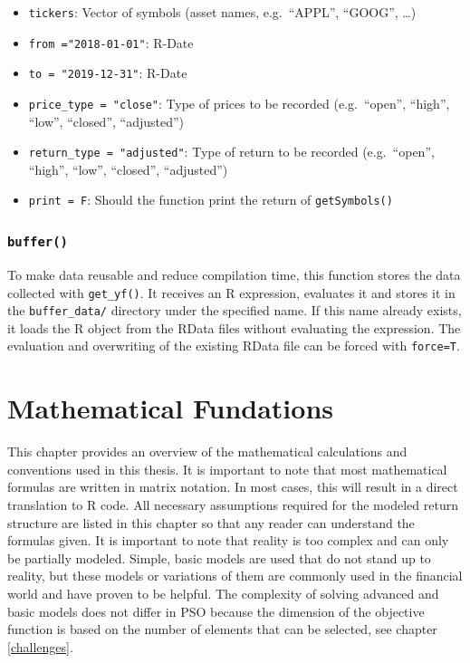 \documentclass[
  oneside]{book}
\providecommand{\tightlist}{%
  \setlength{\itemsep}{0pt}\setlength{\parskip}{0pt}}
\begin{document}
\begin{itemize}
\tightlist
\item
  \texttt{tickers}: Vector of symbols (asset names, e.g.~``APPL'', ``GOOG'', \ldots)
\item
  \texttt{from\ ="2018-01-01"}: R-Date
\item
  \texttt{to\ =\ "2019-12-31"}: R-Date
\item
  \texttt{price\_type\ =\ "close"}: Type of prices to be recorded (e.g.~``open'', ``high'', ``low'', ``closed'', ``adjusted'')
\item
  \texttt{return\_type\ =\ "adjusted"}: Type of return to be recorded (e.g.~``open'', ``high'', ``low'', ``closed'', ``adjusted'')
\item
  \texttt{print\ =\ F}: Should the function print the return of \texttt{getSymbols()}
\end{itemize}

\hypertarget{buffer}{%
\subsection{\texorpdfstring{\texttt{buffer()}}{buffer()}}\label{buffer}}

To make data reusable and reduce compilation time, this function stores the data collected with \texttt{get\_yf()}. It receives an R expression, evaluates it and stores it in the \texttt{buffer\_data/} directory under the specified name. If this name already exists, it loads the R object from the RData files without evaluating the expression. The evaluation and overwriting of the existing RData file can be forced with \texttt{force=T}.

\hypertarget{mathfundations}{%
\chapter{Mathematical Fundations}\label{mathfundations}}

This chapter provides an overview of the mathematical calculations and conventions used in this thesis. It is important to note that most mathematical formulas are written in matrix notation. In most cases, this will result in a direct translation to R code. All necessary assumptions required for the modeled return structure are listed in this chapter so that any reader can understand the formulas given. It is important to note that reality is too complex and can only be partially modeled. Simple, basic models are used that do not stand up to reality, but these models or variations of them are commonly used in the financial world and have proven to be helpful. The complexity of solving advanced and basic models does not differ in PSO because the dimension of the objective function is based on the number of elements that can be selected, see chapter \ref{challenges}.
\end{document}
